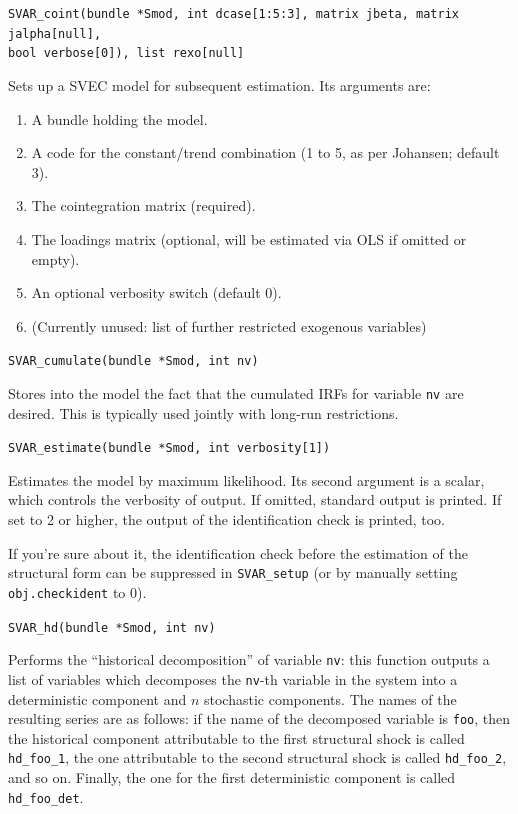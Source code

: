 \documentclass[a4paper,10pt]{article}
\newenvironment{funcdoc}[1]
{\noindent\hrulefill\newline\nopagebreak\texttt{#1}%
\nopagebreak\par\noindent\hrulefill%
\nopagebreak\par\nopagebreak\smallskip\nopagebreak\par}
{\bigskip}
\begin{document}
\begin{funcdoc}{SVAR\_coint(bundle *Smod, int dcase[1:5:3],
			   matrix jbeta, matrix jalpha[null],\\
			   bool verbose[0]), list rexo[null]}
  Sets up a SVEC model for subsequent estimation. Its arguments are:
  \begin{enumerate}
  \item A bundle holding the model.
  \item A code for the constant/trend combination (1 to 5, as per
    Johansen; default 3).
  \item The cointegration matrix (required).
  \item The loadings matrix (optional, will be estimated via OLS if
    omitted or empty).
  \item An optional verbosity switch (default 0).
  \item (Currently unused: list of further restricted exogenous
    variables)
  \end{enumerate}
\end{funcdoc}

\begin{funcdoc}{SVAR\_cumulate(bundle *Smod, int nv)}
  Stores into the model the fact that the cumulated IRFs for
  variable \texttt{nv} are desired. This is typically used jointly
  with long-run restrictions.
\end{funcdoc}

\begin{funcdoc}{SVAR\_estimate(bundle *Smod, int verbosity[1])}
  Estimates the model by maximum likelihood. Its second argument is a
  scalar, which controls the verbosity of output. If omitted,
  standard output is printed. If set to 2 or higher, the output of the 
  identification check is printed, too.
  
  If you're sure about it, the identification check before
  the estimation of the structural form can be suppressed in 
  \texttt{SVAR\_setup} (or by manually setting \texttt{obj.checkident}
  to 0).
\end{funcdoc}

\begin{funcdoc}{SVAR\_hd(bundle *Smod, int nv)}
  Performs the ``historical decomposition'' of variable \texttt{nv}:
  this function outputs a list of variables which decomposes the
  \verb|nv|-th variable in the system into a deterministic component
  and $n$ stochastic components. The names of the resulting series are
  as follows: if the name of the decomposed variable is \texttt{foo},
  then the historical component attributable to the first structural
  shock is called \texttt{hd\_foo\_1}, the one attributable to the
  second structural shock is called \texttt{hd\_foo\_2}, and so
  on. Finally, the one for the first deterministic component is called
  \texttt{hd\_foo\_det}.
\end{funcdoc}
\end{document}

